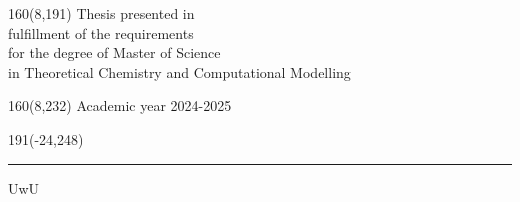 \documentclass[12pt,a4paper,oneside]{book}
\begin{document}
%
\begin{textblock}{160}(8,191)
\textblockcolour{}
\vspace{-\parskip}
\flushright
Thesis presented in\\[4.5pt]
fulfillment of the requirements\\[4.5pt]
for the degree of Master of Science\\[4.5pt]
in Theoretical Chemistry and Computational Modelling\\
\end{textblock}
%
\begin{textblock}{160}(8,232)
\textblockcolour{}
\vspace{-\parskip}
\flushright
Academic year 2024-2025
\end{textblock}
%
\begin{textblock}{191}(-24,248)
{\color{blueline}\rule{550pt}{5.5pt}}
\end{textblock}
%

\setcounter{page}{0}
\onehalfspacing
UwU


\rmfamily




\sffamily
\tableofcontents
\rmfamily

\newpage
\setcounter{page}{0}







\printbibliography

%


\appendix

\end{document}
